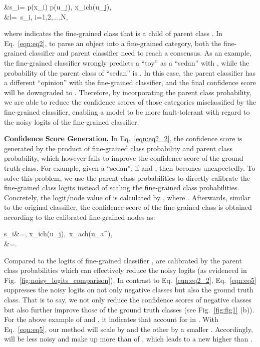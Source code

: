 \documentclass[sigconf]{acmart}
\newcommand{\myparagraph}[1]{{\vspace{0.5em} \noindent \bf #1}}
\begin{document}
	&s_{i}= p(x_{i}) \times p(u_{j}), \quad x_{i}\in ch(u_{j}),\label{eqn:eq2_2} \\
	&l=\ s_{i}, \quad i=1,2,...,N,\label{eqn:eq2_1}
	
where  indicates the fine-grained class  that is a child of parent class . In Eq.~\ref{eqn:eq2}, to parse an object into a fine-grained category, both the fine-grained classifier and parent classifier need to reach a consensus. As an example, the fine-grained classifier wrongly predicts a ``toy'' as a ``sedan'' with , while the probability of the parent class of ``sedan'' is . In this case, the parent classifier has a different ``opinion'' with the fine-grained classifier, and the final confidence score  will be downgraded to . Therefore, by incorporating the parent class probability, we are able to reduce the confidence scores of those categories misclassified by the fine-grained classifier, enabling a model to be more fault-tolerant with regard to the noisy logits of the fine-grained classifier.

\myparagraph{Confidence Score Generation.}
In Eq.~\ref{eqn:eq2_2}, the confidence score is generated by the product of fine-grained class probability and parent class probability, which however fails to improve the confidence score of the ground truth class. For example, given a ``sedan'', if  and , then  becomes  unexpectedly. To solve this problem, we use the parent class probabilities to directly calibrate the fine-grained class logits instead of scaling the fine-grained class probabilities. Concretely, the logit/node value of  is calculated by , where . Afterwards, similar to the original classifier, the confidence score of the fine-grained class  is obtained according to the calibrated fine-grained nodes as:


	s_{i}&=, \quad x_{i}\in ch(u_{j}),\ x_{a}\in ch(u_{a^{\star}}),\label{eqn:eq5_2} \\
	&=.\label{eqn:eq5_1}
	

Compared to the logits of fine-grained classifier ,  are calibrated by the parent class probabilities which can effectively reduce the noisy logits (as evidenced in Fig.~\ref{fig:noisy_logits_comparison}). In contrast to Eq.~\ref{eqn:eq2_2}, Eq.~\ref{eqn:eq5} suppresses the noisy logits on not only negative classes but also the ground truth class. That is to say, we not only reduce the confidence scores of negative classes but also further improve those of the ground truth classes (see Fig.~\ref{fig:fig1} (b)). For the above example of  and , it indicates that  account for  in . With Eq.~\ref{eqn:eq5}, our method will scale  by  and the other  by a smaller . Accordingly,  will be less noisy and make up more than  of , which leads to a new  higher than . 
\end{document}
